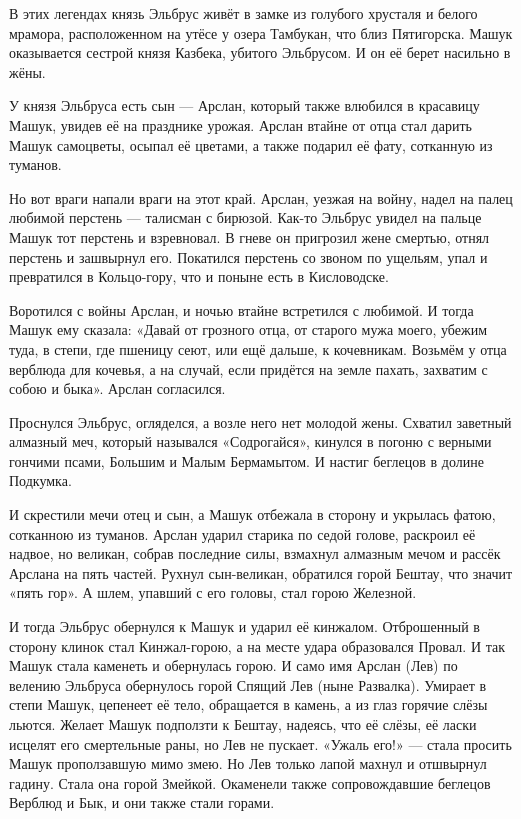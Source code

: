 В этих легендах князь Эльбрус живёт в замке из голубого хрусталя и белого
мрамора, расположенном на утёсе у озера Тамбукан, что близ Пятигорска. Машук
оказывается сестрой князя Казбека, убитого Эльбрусом. И он её берет насильно в
жёны.

У князя Эльбруса есть сын — Арслан, который также влюбился в красавицу Машук,
увидев её на празднике урожая. Арслан втайне от отца стал дарить Машук
самоцветы, осыпал её цветами, а также подарил её фату, сотканную из туманов.

Но вот враги напали враги на этот край. Арслан, уезжая на войну, надел на палец
любимой перстень — талисман с бирюзой. Как-то Эльбрус увидел на пальце Машук
тот перстень и взревновал. В гневе он пригрозил жене смертью, отнял перстень и
зашвырнул его. Покатился перстень со звоном по ущельям, упал и превратился в
Кольцо-гору, что и поныне есть в Кисловодске.

Воротился с войны Арслан, и ночью втайне встретился с любимой. И тогда Машук
ему сказала: «Давай от грозного отца, от старого мужа моего, убежим туда, в
степи, где пшеницу сеют, или ещё дальше, к кочевникам. Возьмём у отца верблюда
для кочевья, а на случай, если придётся на земле пахать, захватим с собою и
быка». Арслан согласился.

Проснулся Эльбрус, огляделся, а возле него нет молодой жены. Схватил заветный
алмазный меч, который назывался «Содрогайся», кинулся в погоню с верными
гончими псами, Большим и Малым Бермамытом. И настиг беглецов в долине Подкумка.

И скрестили мечи отец и сын, а Машук отбежала в сторону и укрылась фатою,
сотканною из туманов. Арслан ударил старика по седой голове, раскроил её
надвое, но великан, собрав последние силы, взмахнул алмазным мечом и рассёк
Арслана на пять частей. Рухнул сын-великан, обратился горой Бештау, что значит
«пять гор». А шлем, упавший с его головы, стал горою Железной.

И тогда Эльбрус обернулся к Машук и ударил её кинжалом. Отброшенный в сторону
клинок стал Кинжал-горою, а на месте удара образовался Провал. И так Машук
стала каменеть и обернулась горою. И само имя Арслан (Лев) по велению Эльбруса
обернулось горой Спящий Лев (ныне Развалка). Умирает в степи Машук, цепенеет её
тело, обращается в камень, а из глаз горячие слёзы льются. Желает Машук
подползти к Бештау, надеясь, что её слёзы, её ласки исцелят его смертельные
раны, но Лев не пускает. «Ужаль его!» — стала просить Машук проползавшую мимо
змею. Но Лев только лапой махнул и отшвырнул гадину. Стала она горой Змейкой.
Окаменели также сопровождавшие беглецов Верблюд и Бык, и они также стали
горами.

